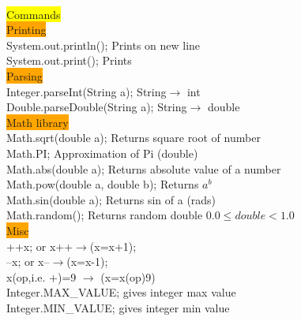 ~\\
\color{VioletRed}
\colorbox{Yellow}{Commands}
%
\\ \colorbox{orange}{Printing}
\\System.out.println(); Prints on new line
\\ System.out.print(); Prints
%
\\ \colorbox{orange}{Parsing}
\\ Integer.parseInt(String a); String$\rightarrow$ int
\\ Double.parseDouble(String a); String$\rightarrow$ double
%
\\ \colorbox{orange}{Math library}
\\ Math.sqrt(double a); Returns square root of number
\\ Math.PI; Approximation of Pi (double)
\\ Math.abs(double a); Returns absolute value of a number
\\ Math.pow(double a, double b); Returns $a^b$
\\ Math.sin(double a); Returns sin of a (rads)
\\ Math.random(); Returns random double $0.0\leq double< 1.0$
%
\\ \colorbox{orange}{Misc}
\\ ++x; or x++$\rightarrow$(x=x+1);
\\ --x; or x--$\rightarrow$(x=x-1);
\\ x(op,i.e. +)=9 $\rightarrow$ (x=x(op)9)
\\ Integer.MAX\_VALUE; gives integer max value
\\ Integer.MIN\_VALUE; gives integer min value